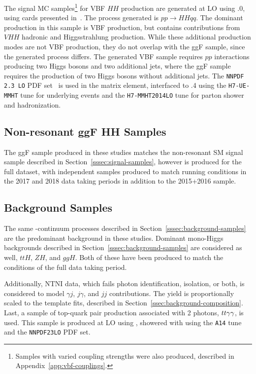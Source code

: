 The signal MC samples\footnote{Samples with varied coupling strengths were also produced, described in Appendix~\ref{app:vbf-couplings}.} for VBF $HH$ production are generated at LO using .0, using cards presented in~\cite{vbfhh}. The process generated is $pp \rightarrow HHqq$. The dominant production in this sample is VBF \hh production, but contains contributions from $VHH$ hadronic and Higgsstrahlung production. While these additional production modes are not \gls{VBF} \hh production, they do not overlap with the \gls{ggF} \hh sample, since the generated process differs. The generated \gls{VBF} sample requires $pp$ interactions producing two Higgs bosons and two additional jets, where the \gls{ggF} sample requires the production of two Higgs bosons without additional jets. The \texttt{NNPDF 2.3 LO} PDF set~\cite{NNPDF} is used in the matrix element, interfaced to .4 using the \texttt{H7-UE-MMHT} tune for underlying events and the \texttt{H7-MMHT2014LO} tune for parton shower and hadronization.

\subsection{Non-resonant ggF HH Samples}

The ggF \hh sample produced in these studies matches the non-resonant \gls{SM} signal sample described in Section~\ref{sssec:signal-samples}, however is produced for the full \RunTwo dataset, with independent samples produced to match running conditions in the 2017 and 2018 data taking periods in addition to the 2015+2016 sample.

\subsection{Background Samples}\label{ssec:vbf-bkg-samples}

The same \yy-continuum processes described in Section~\ref{sssec:background-samples} are the predominant background in these studies. Dominant mono-Higgs backgrounds described in Section~\ref{sssec:background-samples} are considered as well, $ttH$, $ZH$, and $ggH$. Both of these have been produced to match the conditions of the full \RunTwo data taking period.

Additionally, \gls{NTNI} data, which fails photon identification, isolation, or both, is considered to model $\gamma j$, $j \gamma$, and $jj$ contributions. The yield is proportionally scaled to the template fits, described in Section~\ref{ssec:background-composition}. Last, a sample of top-quark pair production associated with 2 photons, $tt \gamma\gamma$, is used. This sample is produced at \gls{LO} using \MADGRAPH, showered with \peight using the \texttt{A14} tune and the \texttt{NNPDF23LO} PDF set.


